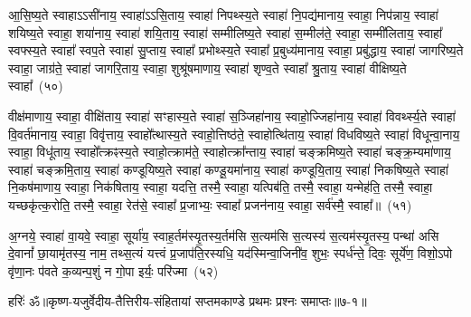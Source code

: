 आ॒सि॒ष्य॒ते स्वाहा\-ऽऽ\-सी॑नाय॒ स्वाहा॑\-ऽऽ\-सि॒ताय॒ स्वाहा॑ निपथ्स्य॒ते स्वाहा॑ नि॒पद्य॑मानाय॒ स्वाहा॒ निप॑न्नाय॒ स्वाहा॑ शयिष्य॒ते स्वाहा॒ शया॑नाय॒ स्वाहा॑ शयि॒ताय॒ स्वाहा॑ सम्मीलिष्य॒ते स्वाहा॑ स॒म्मील॑ते॒ स्वाहा॒ सम्मी॑लिताय॒ स्वाहा᳚ स्वफ्स्य॒ते स्वाहा᳚ स्वप॒ते स्वाहा॑ सु॒प्ताय॒ स्वाहा᳚ प्रभोथ्स्य॒ते स्वाहा᳚ प्र॒बुध्य॑मानाय॒ स्वाहा॒ प्रबु॑द्धाय॒ स्वाहा॑ जागरिष्य॒ते स्वाहा॒ जाग्र॑ते॒ स्वाहा॑ जागरि॒ताय॒ स्वाहा॒ शुश्रू॑षमाणाय॒ स्वाहा॑ शृण्व॒ते स्वाहा᳚ श्रु॒ताय॒ स्वाहा॑ वीक्षिष्य॒ते स्वाहा᳚~(५०)\ip

वीक्ष॑माणाय॒ स्वाहा॒ वीक्षि॑ताय॒ स्वाहा॑ सꣳहास्य॒ते स्वाहा॑ स॒ञ्जिहा॑नाय॒ स्वाहो॒ज्जिहा॑नाय॒ स्वाहा॑ विवर्थ्स्य॒ते स्वाहा॑ वि॒वर्त॑मानाय॒ स्वाहा॒ विवृ॑त्ताय॒ स्वाहो᳚त्थास्य॒ते स्वाहो॒त्तिष्ठ॑ते॒ स्वाहोत्थि॑ताय॒ स्वाहा॑ विधविष्य॒ते स्वाहा॑ विधून्वा॒नाय॒ स्वाहा॒ विधू॑ताय॒ स्वाहो᳚त्क्रꣴस्य॒ते स्वाहो॒त्क्राम॑ते॒ स्वाहोत्क्रा᳚न्ताय॒ स्वाहा॑ चङ्क्रमिष्य॒ते स्वाहा॑ चङ्क्र॒म्यमा॑णाय॒ स्वाहा॑ चङ्क्रमि॒ताय॒ स्वाहा॑ कण्डूयिष्य॒ते स्वाहा॑ कण्डू॒यमा॑नाय॒ स्वाहा॑ कण्डूयि॒ताय॒ स्वाहा॑ निकषिष्य॒ते स्वाहा॑ नि॒कष॑माणाय॒ स्वाहा॒ निक॑षिताय॒ स्वाहा॒ यदत्ति॒ तस्मै॒ स्वाहा॒ यत्पिब॑ति॒ तस्मै॒ स्वाहा॒ यन्मेह॑ति॒ तस्मै॒ स्वाहा॒ यच्छकृ॑त्क॒रोति॒ तस्मै॒ स्वाहा॒ रेत॑से॒ स्वाहा᳚ प्र॒जाभ्यः॒ स्वाहा᳚ प्रजन॑नाय॒ स्वाहा॒ सर्व॑स्मै॒ स्वाहा᳚॥~(५१)\ip

{\anuvakamend[{}]}

अ॒ग्नये॒ स्वाहा॑ वा॒यवे॒ स्वाहा॒ सूर्या॑य॒ स्वाह॒र्तम॑स्यृ॒तस्य॒र्तम॑सि स॒त्यम॑सि स॒त्यस्य॑ स॒त्यम॑स्यृ॒तस्य॒ पन्था॑ असि दे॒वानां᳚ छा॒यामृ॑तस्य॒ नाम॒ तथ्स॒त्यं यत्त्वं प्र॒जा\-प॑ति॒रस्यधि॒ यद॑स्मिन्वा॒जिनी॑व॒ शुभः॒ स्पर्ध॑न्ते॒ दिवः॒ सूर्ये॑ण॒ विशो॒\-ऽपो वृ॑णा॒नः प॑वते क॒व्यन्प॒शुं न गो॒पा इर्यः॒ परि॑ज्मा~(५२)\ip


{हरिः॑ ॐ}{॥कृष्ण-यजुर्वेदीय-तैत्तिरीय-संहितायां सप्तमकाण्डे प्रथमः प्रश्नः समाप्तः॥७-१॥}


